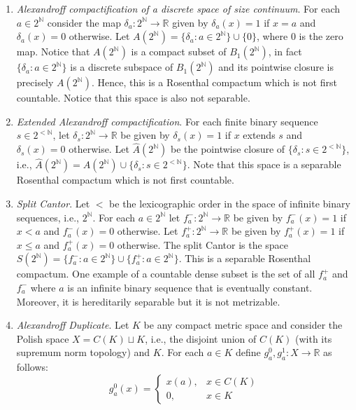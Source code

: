 \documentclass[psamsfonts]{amsart}
\theoremstyle{definition}
\theoremstyle{remark}
\numberwithin{equation}{section}
\begin{document}
\begin{enumerate}
    \item \emph{Alexandroff compactification of a discrete space of size continuum}. For each $a\in 2^\mathbb{N}$ consider the map $\delta_a:2^\mathbb{N}\rightarrow\mathbb{R}$ given by $\delta_a(x)=1$ if $x=a$ and $\delta_a(x)=0$ otherwise. Let $A(2^\mathbb{N})=\{\delta_a:a\in 2^\mathbb{N}\}\cup\{0\}$, where $0$ is the zero map. Notice that $A(2^\mathbb{N})$ is a compact subset of $B_1(2^\mathbb{N})$, in fact $\{\delta_a:a\in 2^\mathbb{N}\}$ is a discrete subspace of $B_1(2^\mathbb{N})$ and its pointwise closure is precisely $A(2^\mathbb{N})$. Hence, this is a Rosenthal compactum which is not first countable. Notice that this space is also not separable.
    \item \emph{Extended Alexandroff compactification}. For each finite binary sequence $s\in 2^{<\mathbb{N}}$, let $\delta_s:2^\mathbb{N}\rightarrow\mathbb{R}$ be given by $\delta_s(x)=1$ if $x$ extends $s$ and $\delta_s(x)=0$ otherwise. Let $\hat{A}(2^\mathbb{N})$ be the pointwise closure of $\{\delta_s:s\in2^{<\mathbb{N}}\}$, i.e., $\hat{A}(2^\mathbb{N})=A(2^\mathbb{N})\cup\{\delta_s:s\in 2^{<\mathbb{N}}\}$. Note that this space is a separable Rosenthal compactum which is not first countable.
    \item \emph{Split Cantor}. Let $<$ be the lexicographic order in the space of infinite binary sequences, i.e., $2^\mathbb{N}$. For each $a\in 2^\mathbb{N}$ let $f_a^-:2^\mathbb{N}\rightarrow\mathbb{R}$ be given by $f_a^-(x)=1$ if $x<a$ and $f_a^-(x)=0$ otherwise. Let $f_a^+:2^\mathbb{N}\rightarrow\mathbb{R}$ be given by $f_a^+(x)=1$ if $x\leq a$ and $f_a^+(x)=0$ otherwise. The split Cantor is the space $S(2^\mathbb{N})=\{f_a^-:a\in 2^\mathbb{N}\}\cup\{f_a^+:a\in 2^\mathbb{N}\}$. This is a separable Rosenthal compactum. One example of a countable dense subset is the set of all $f_a^+$ and $f_a^-$ where $a$ is an infinite binary sequence that is eventually constant. Moreover, it is hereditarily separable but it is not metrizable. 
    \item \emph{Alexandroff Duplicate}. Let $K$ be any compact metric space and consider the Polish space $X=C(K)\sqcup K$, i.e., the disjoint union of $C(K)$ (with its supremum norm topology) and $K$. For each $a\in K$ define $g_a^0,g_a^1:X\rightarrow\mathbb{R}$ as follows:
    $$g_a^0(x)=\left\{\begin{array}{cc}
        x(a), & x\in C(K) \\
        0, & x\in K
    \end{array}\right.$$

\end{enumerate}
\end{document}
